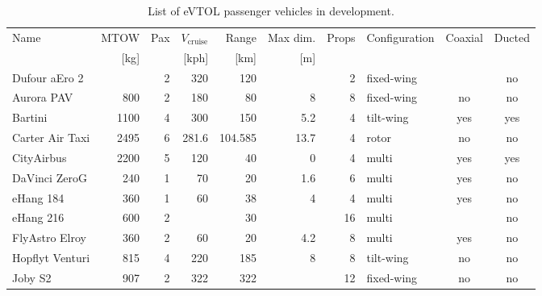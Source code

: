 {\small
\begin{table}[h]
\label{tab:evtolstats}
\captionsetup{justification=centering}
\caption{List of eVTOL passenger vehicles in development.}
\begin{tabular}{l|rrrrrrlcc}
\rowcolor{lightblue}
Name             & MTOW & Pax & $V_\text{cruise}$ & Range & Max dim. & Props & Configuration & Coaxial & Ducted \\
\rowcolor{lightblue}
 & {[}kg{]} & & {[}kph{]} & {[}km{]} & {[}m{]} & & & & \\\hline
Dufour aEro 2           &               & 2   & 320               & 120            &                  & 2     & fixed-wing    &         & no     \\
Aurora PAV          & 800           & 2   & 180               & 80             & 8                & 8     & fixed-wing    & no      & no     \\
Bartini \footnotemark          & 1100          & 4   & 300               & 150            & 5.2              & 4     & tilt-wing     & yes     & yes    \\
Carter Air Taxi  & 2495          & 6   & 281.6             & 104.585        & 13.7             & 4     & rotor         & no      & no     \\
CityAirbus       & 2200          & 5   & 120               & 40             & 0                & 4     & multi         & yes     & yes    \\
DaVinci ZeroG    & 240           & 1   & 70                & 20             & 1.6              & 6     & multi         & yes     & no     \\
eHang 184        & 360           & 1   & 60                & 38             & 4                & 4     & multi         & yes     & no     \\
eHang 216        & 600           & 2   &                   & 30             &                  & 16    & multi         &         & no     \\
FlyAstro Elroy            & 360           & 2   & 60                & 20             & 4.2              & 8     & multi         & yes     & no     \\
Hopflyt Venturi     & 815           & 4   & 220               & 185            & 8                & 8     & tilt-wing     & no      & no     \\
Joby S2          & 907           & 2   & 322               & 322            &                  & 12    & fixed-wing    & no      & no     \\

\end{tabular}
\end{table}}
